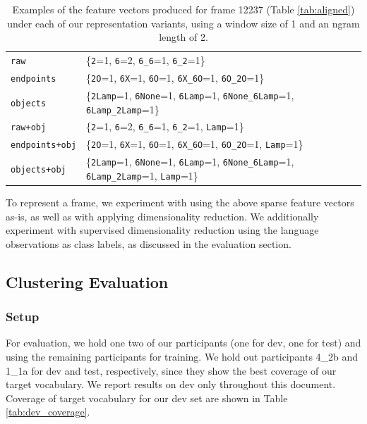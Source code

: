 \documentclass[11pt]{article}
\begin{document}
\begin{table}[ht!]
\centering
\begin{tabular}{|ll|}
\hline
\texttt{raw} & \{\texttt{2}=1, \texttt{6}=2, \texttt{6\_6}=1, \texttt{6\_2}=1\} \\
\texttt{endpoints} & \{\texttt{2O}=1, \texttt{6X}=1, \texttt{6O}=1, \texttt{6X\_6O}=1, \texttt{6O\_2O}=1\} \\
\texttt{objects} & \{\texttt{2Lamp}=1, \texttt{6None}=1, \texttt{6Lamp}=1, \texttt{6None\_6Lamp}=1, \texttt{6Lamp\_2Lamp}=1\} \\
\texttt{raw+obj} & \{\texttt{2}=1, \texttt{6}=2, \texttt{6\_6}=1, \texttt{6\_2}=1, \texttt{Lamp}=1\} \\
\texttt{endpoints+obj} & \{\texttt{2O}=1, \texttt{6X}=1, \texttt{6O}=1, \texttt{6X\_6O}=1, \texttt{6O\_2O}=1, \texttt{Lamp}=1\} \\
\texttt{objects+obj} & \{\texttt{2Lamp}=1, \texttt{6None}=1, \texttt{6Lamp}=1, \texttt{6None\_6Lamp}=1, \texttt{6Lamp\_2Lamp}=1, \texttt{Lamp}=1\} \\
\hline
\end{tabular}
\caption{Examples of the feature vectors produced for frame 12237 (Table \ref{tab:aligned}) under each of our representation variants, using a window size of 1 and an ngram length of 2.}
\label{tab:features}
\end{table}

To represent a frame, we experiment with using the above sparse feature vectors as-is, as well as with applying dimensionality reduction. We additionally experiment with supervised dimensionality reduction using the language observations as class labels, as discussed in the evaluation section. 

\subsection{Clustering Evaluation}

\subsubsection{Setup}

For evaluation, we hold one two of our participants (one for dev, one for test) and using the remaining participants for training. We hold out participants 4\_2b and 1\_1a for dev and test, respectively, since they show the best coverage of our target vocabulary. We report results on dev only throughout this document. Coverage of target vocabulary for our dev set are shown in Table \ref{tab:dev_coverage}. 
\end{document}
